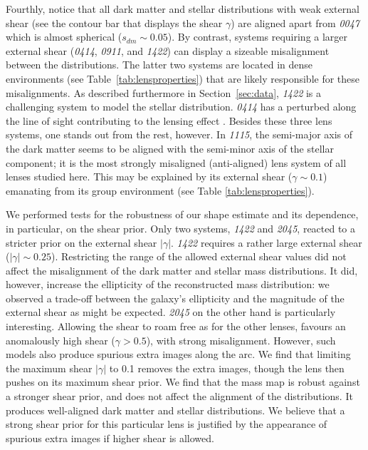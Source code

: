 \documentclass[useAMS,usenatbib]{mn2e}
\begin{document}
Fourthly, notice that all dark matter and stellar distributions with weak external shear (see the contour bar that displays the shear $\gamma$) are aligned apart from {\it0047} which is almost spherical ($s_{dm}\sim0.05$). By contrast, systems requiring a larger external shear ({\it0414}, {\it0911}, and {\it1422}) can display a sizeable misalignment between the distributions. The latter two systems are located in dense environments (see Table~\ref{tab:lensproperties}) that are likely responsible for these misalignments. As described furthermore in Section~\ref{sec:data}, {\it1422} is a challenging system to model the stellar distribution. {\it0414} has a perturbed along the line of sight contributing to the lensing effect \citep{2011MNRAS.413L..86C}. Besides these three lens systems, one stands out from the rest, however. In {\it1115}, the semi-major axis of the dark matter seems to be aligned with the semi-minor axis of the stellar component; it is the most strongly misaligned (anti-aligned) lens system of all lenses studied here. This may be explained by its external shear ($\gamma \sim 0.1$) emanating from its group environment (see Table \ref{tab:lensproperties}).

We performed tests for the robustness of our shape estimate and its dependence, in particular, on the shear prior. Only two systems, {\it1422} and {\it2045}, reacted to a stricter prior on the external shear $|\gamma|$. {\it1422} requires a rather large external shear ($|\gamma|\sim0.25$). Restricting the range of the allowed external shear values did not affect the misalignment of the dark matter and stellar mass distributions. It did, however, increase the ellipticity of the reconstructed mass distribution: we observed a trade-off between the galaxy's ellipticity and the magnitude of the external shear as might be expected. {\it2045} on the other hand is particularly interesting. Allowing the shear to roam free as for the other lenses, favours an anomalously high shear ($\gamma > 0.5$), with strong misalignment. However, such models also produce spurious extra images along the arc. We find that limiting the maximum shear $|\gamma|$ to 0.1 removes the extra images, though the lens then pushes on its maximum shear prior. We find that the mass map is robust against a stronger shear prior, and does not affect the alignment of the distributions. It produces well-aligned dark matter and stellar distributions. We believe that a strong shear prior for this particular lens is justified by the appearance of spurious extra images if higher shear is allowed.
\end{document}
